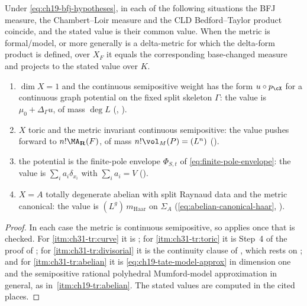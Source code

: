 \begin{corollary}
\label{cor:ch31-four-families-transfer}
Under \eqref{eq:ch19-bfj-hypotheses}, in each of the following situations
the BFJ measure, the Chambert--Loir measure and the CLD Bedford--Taylor
product coincide, and the stated value is their common value.  When the
metric is formal/model, or more generally is a delta-metric for which the
delta-form product is defined, over $X_F$ it equals the corresponding base-changed measure and projects
to the stated value over $K$.
\begin{enumerate}
\item\label{itm:ch31-tr:curve} $\dim X=1$ and the continuous
 semipositive weight has the form $u\circ p_{\cX}$ for a continuous graph
 potential on the fixed split skeleton $\Gamma$: the value is
 $\mu_0+\Delta_\Gamma u$, of mass
 $\deg L$ (,
 ).
\item\label{itm:ch31-tr:toric} $X$ toric and the metric invariant
 continuous semipositive: the value pushes forward to
 $n!\MA_{\mathbf R}(F)$, of mass $n!\vol_M(P)=(L^n)$
 ().
\item\label{itm:ch31-tr:divisorial} the potential is the finite-pole
 envelope $\Phi_{S,t}$ of \eqref{eq:finite-pole-envelope}: the value is
 $\sum_ia_i\delta_{x_i}$ with $\sum_ia_i=V$
 ().
\item\label{itm:ch31-tr:abelian} $X=A$ totally degenerate abelian with
 split Raynaud data and the metric canonical: the value is
 $(L^g)\,m_{\mathrm{Haar}}$ on $\Sigma_A$
 (\eqref{eq:abelian-canonical-haar},
 ).
\end{enumerate}
\end{corollary}

\begin{proof}
In each case the metric is continuous semipositive, so
 applies once that is checked.
For \cref{itm:ch31-tr:curve} it is
; for \cref{itm:ch31-tr:toric} it is Step~4 of
the proof of ; for
\cref{itm:ch31-tr:divisorial} it is the continuity clause of
, which rests on
; and for \cref{itm:ch31-tr:abelian} it is
\eqref{eq:ch19-tate-model-approx} in dimension one and the semipositive
rational polyhedral Mumford-model approximation in general, as in
\,\cref{itm:ch19-tr:abelian}.  The stated values are
computed in the cited places.
\end{proof}

